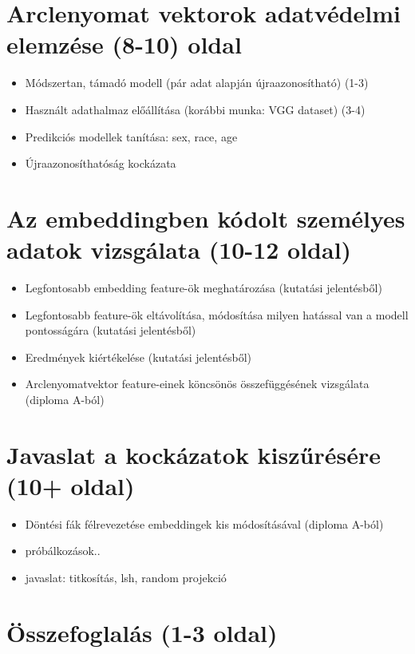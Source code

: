 \section{Arclenyomat vektorok adatvédelmi elemzése (8-10) oldal}
\begin{itemize}
	\item Módszertan, támadó modell (pár adat alapján újraazonosítható) (1-3) 
	\item Használt adathalmaz előállítása (korábbi munka:
	VGG dataset) (3-4)
	\item Predikciós modellek tanítása: sex, race, age 
	\item Újraazonosíthatóság kockázata
\end{itemize}

\section{Az embeddingben kódolt személyes adatok vizsgálata (10-12 oldal)}
\begin{itemize}
	\item Legfontosabb embedding feature-ök meghatározása (kutatási jelentésből)
	\item Legfontosabb feature-ök eltávolítása, módosítása milyen hatással van a modell pontosságára (kutatási jelentésből) 
	\item Eredmények kiértékelése (kutatási jelentésből) 
	\item Arclenyomatvektor feature-einek köncsönös összefüggésének vizsgálata (diploma A-ból)
\end{itemize}


\section{Javaslat a kockázatok kiszűrésére (10+ oldal)}
\begin{itemize}
	\item Döntési fák félrevezetése embeddingek kis módosításával (diploma A-ból)
	\item próbálkozások.. 
	\item javaslat: titkosítás, lsh, random projekció
\end{itemize}

\section{Összefoglalás (1-3 oldal)}
